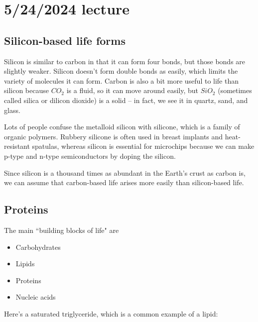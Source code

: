 \documentclass[class=article, crop=false]{standalone}
\begin{document}
\section{5/24/2024 lecture}
\subsection{Silicon-based life forms}
Silicon is similar to carbon in that it can form four bonds, but those bonds are slightly weaker. Silicon doesn't form double bonds as easily, which limits the variety of molecules it can form. Carbon is also a bit more useful to life than silicon because $CO_2$ is a fluid, so it can move around easily, but $SiO_2$ (sometimes called silica or dilicon dioxide) is a solid -- in fact, we see it in quartz, sand, and glass.
\begin{note}
    Lots of people confuse the metalloid silicon with silicone, which is a family of organic polymers. Rubbery silicone is often used in breast implants and heat-resistant spatulas, whereas silicon is essential for microchips because we can make p-type and n-type semiconductors by doping the silicon.
\end{note}
\par
Since silicon is a thousand times as abundant in the Earth's crust as carbon is, we can assume that carbon-based life arises more easily than silicon-based life.
\subsection{Proteins}
The main ``building blocks of life" are
\begin{itemize}
    \item Carbohydrates
    \item Lipids
    \item Proteins
    \item Nucleic acids
\end{itemize}
Here's a saturated triglyceride, which is a common example of a lipid:
\end{document}
